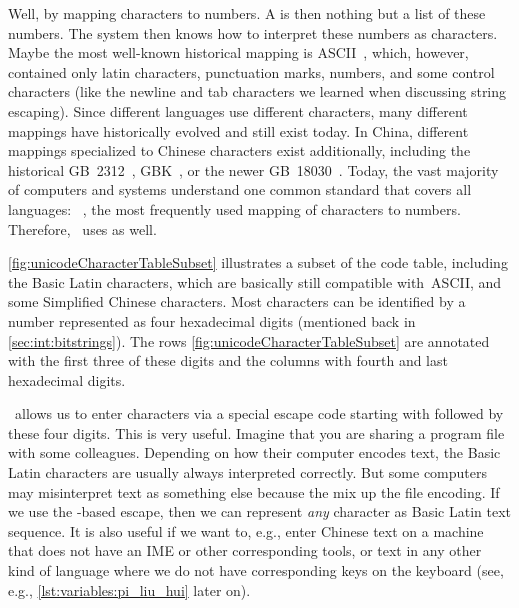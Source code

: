 Well, by mapping characters to numbers.
A  is then nothing but a list of these numbers.
The system then knows how to interpret these numbers as characters.
Maybe the most well-known historical mapping is ASCII~\cite{ASA1963ASCII,USAS1967USCFII}, which, however, contained only latin characters, punctuation marks, numbers, and some control characters (like the newline and tab characters we learned when discussing string escaping).
Since different languages use different characters, many different mappings have historically evolved and still exist today.
In China, different mappings specialized to Chinese characters exist additionally, including the historical GB~2312~\cite{GBT23121980PROCNSG21CCECSFIE}, GBK~\cite{TSSL1995CICSNSE}, or the newer GB~18030~\cite{GB180302022ITCCCS}.
Today, the vast majority of computers and systems understand one common standard that covers all languages:
~\cite{TUC2023U1510,TUC2023U151ACS,ISOIEC106462020ITUCCSU}, the most frequently used mapping of characters to numbers.
Therefore, \python\ uses  as well.

\cref{fig:unicodeCharacterTableSubset} illustrates a subset of the  code table, including the Basic Latin characters, which are basically still compatible with~ASCII, and some Simplified Chinese characters.
Most  characters can be identified by a number represented as four hexadecimal digits (mentioned back in \cref{sec:int:bitstrings}).
The rows \cref{fig:unicodeCharacterTableSubset} are annotated with the first three of these digits and the columns with fourth and last hexadecimal digits.

\python\ allows us to enter  characters via a special escape code starting with \pythonil{\\u} followed by these four digits.
This is very useful.
Imagine that you are sharing a program file with some colleagues.
Depending on how their computer encodes text, the Basic Latin characters are usually always interpreted correctly.
But some computers may misinterpret  text as something else because the mix up the file encoding.
If we use the \pythonil{\\u}-based escape, then we can represent \emph{any} character as Basic Latin text sequence.
It is also useful if we want to, e.g., enter Chinese text on a machine that does not have an IME or other corresponding tools, or text in any other kind of language where we do not have corresponding keys on the keyboard (see, e.g., \cref{lst:variables:pi_liu_hui} later on).

